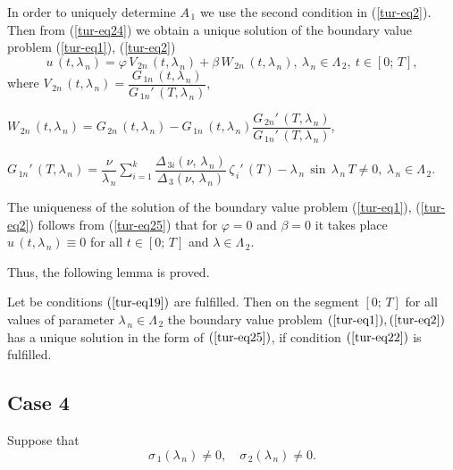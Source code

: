 ﻿\documentclass[
11pt,%
tightenlines,%
twoside,%
onecolumn,%
nofloats,%
nobibnotes,%
nofootinbib,%
superscriptaddress,%
noshowpacs,%
centertags]%
{revtex4}
\begin{document}
In order to uniquely determine $A_{\, 1}$ we use the second condition in (\ref{tur-eq2}). Then from (\ref{tur-eq24}) we obtain a unique solution of the boundary value problem (\ref{tur-eq1}), (\ref{tur-eq2})  
\begin{equation} \label{tur-eq25}	
u \, (t , \lambda_{\, n})=\varphi \, V_{\, 2 n} \, (t , \lambda_{\, n})+\beta \, W_{\, 2 n} \, (t , \lambda_{\, n}) , \: \lambda_{\, n} \in \Lambda_{\, 2} , \: t \in [0 ; \, T] ,
\end{equation}
where $V_{\, 2 n} \, (t , \lambda_{\, n})=\dfrac{G_{\, 1 n} \, (t , \lambda_{\, n})}{G_{\, 1 n}' \, (T , \lambda_{\, n})}$, 

$W_{\, 2 n} \, (t , \lambda_{\, n})=G_{\, 2 n} \, (t , \lambda_{\, n})-
G_{\, 1 n} \, (t , \lambda_{\, n}) \dfrac{G_{\, 2 n}' \, (T , \lambda_{\, n})}{G_{\, 1 n}' \, (T , \lambda_{\, n})}$,

$G_{\, 1 n}' \, (T , \lambda_{\, n})=\dfrac{\nu}{\lambda_{\, n}} \sum \limits_{i=1}^{k}  \dfrac{\Delta_{\, 3 i }(\nu , \, \lambda_{\, n})}{\Delta_{\, 3} (\nu , \, \lambda_{\, n})} \, \zeta_{\, i}' \, (T)-\lambda_{\, n} \, \sin \, \lambda_{\, n} \, T \ne 0 , \: \lambda_{\, n} \in \Lambda_{\, 2}$.

The uniqueness of the solution of the boundary value problem (\ref{tur-eq1}), (\ref{tur-eq2}) follows from (\ref{tur-eq25}) that for $\varphi=0$ and $\beta=0$ it takes place $u \, (t , \lambda_{\, n}) \equiv 0$ for all $t \in [0 ; \, T]$ and $\lambda \in \Lambda_{\, 2}$.
	
	 Thus, the following lemma is proved.

\begin{lemma} Let be conditions $(\ref{tur-eq19})$ are fulfilled. Then on the segment  $[0 ; \, T]$ for all values of parameter $\lambda_{\, n} \in \Lambda_{\, 2}$ the boundary value problem $(\ref{tur-eq1}), (\ref{tur-eq2})$ has a unique solution in the form of $(\ref{tur-eq25})$, if condition  $(\ref{tur-eq22})$ is fulfilled.
\end{lemma}

     
\subsection{Case 4}

Suppose that
 \begin{equation} \label{tur-eq26}
 \sigma_{\, 1} (\lambda_{\, n}) \ne 0 , \quad  \sigma_{\, 2} (\lambda_{\, n}) \ne 0 .
\end{equation}    
\end{document}
